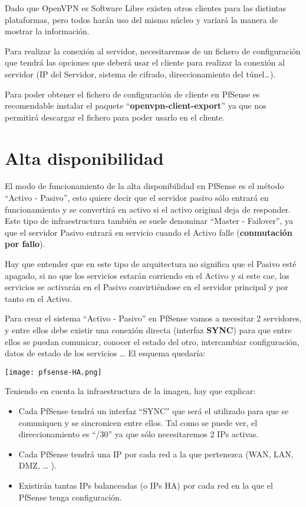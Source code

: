 Dado que OpenVPN es Software Libre existen otros clientes para las distintas plataformas, pero todos harán uso del mismo núcleo y variará la manera de mostrar la información.

Para realizar la conexión al servidor, necesitaremos de un fichero de configuración que tendrá las opciones que deberá usar el cliente para realizar la conexión al servidor (IP del Servidor, sistema de cifrado, direccionamiento del túnel…).

Para poder obtener el fichero de configuración de cliente en PfSense es recomendable instalar el paquete “\textbf{openvpn-client-export}” ya que nos permitirá descargar el fichero para poder usarlo en el cliente.


\chapter{Alta disponibilidad}
El modo de funcionamiento de la alta disponibilidad en PfSense es el método “Activo - Pasivo”, esto quiere decir que el servidor pasivo sólo entrará en funcionamiento y se convertirá en activo si el activo original deja de responder. Este tipo de infraestructura también se suele denominar “Master - Failover”, ya que el servidor Pasivo entrará en servicio cuando el Activo falle (\textbf{conmutación por fallo}).

Hay que entender que en este tipo de arquitectura no significa que el Pasivo esté apagado, si no que los servicios estarán corriendo en el Activo y si este cae, los servicios se activarán en el Pasivo convirtiéndose en el servidor principal y por tanto en el Activo.

Para crear el sistema “Activo - Pasivo” en PfSense vamos a necesitar 2 servidores, y entre ellos debe existir una conexión directa (interfaz \textbf{SYNC}) para que entre ellos se puedan comunicar, conocer el estado del otro, intercambiar configuración, datos de estado de los servicios … El esquema quedaría:

\begin{center}
    \vspace{-10pt}
    \texttt{[image: pfsense-HA.png]}
    \vspace{-20pt}
\end{center}


Teniendo en cuenta la infraestructura de la imagen, hay que explicar:

\begin{itemize}
    \item Cada PfSense tendrá un interfaz “SYNC” que será el utilizado para que se comuniquen y se sincronicen entre ellos. Tal como se puede ver, el direccionamiento es “/30” ya que sólo necesitaremos 2 IPs activas.
    \item Cada PfSense tendrá una IP por cada red a la que pertenezca (WAN, LAN, DMZ, … ).
    \item Existirán tantas IPs balanceadas (o IPs HA) por cada red en la que el PfSense tenga configuración.
\end{itemize}

